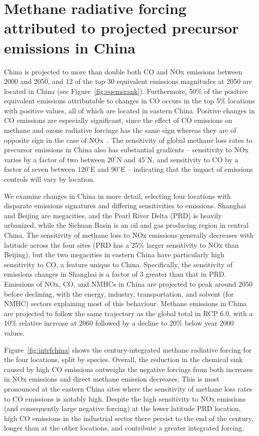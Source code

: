 \section{Methane radiative forcing attributed to projected precursor emissions in China}
\label{sec:china}
China is projected to more than double both CO and NOx emissions between 2000 and 2050, and 12 of the top 30 equivalent emissions magnitudes at 2050 are located in China (see Figure~\ref{fig:eqemsrank}). Furthermore, 50\% of the positive equivalent emissions attributable to changes in CO occurs in the top 5\% locations with positive values, all of which are located in eastern China. Positive changes in CO emissions are especially significant, since the effect of CO emissions on methane and ozone radiative forcings has the same sign whereas they are of opposite sign in the case of NOx~\citep{ref:myhre2013}. The sensitivity of global methane loss rates to precursor emissions in China also has substantial gradients -- sensitivity to NOx varies by a factor of two between $20^{\circ}$N and $45^{\circ}$N, and sensitivity to CO by a factor of seven between $120^{\circ}$E and $90^{\circ}$E -- indicating that the impact of emissions controls will vary by location. 

We examine changes in China in more detail, selecting four locations with disparate emissions signatures and differing sensitivities to emissions. Shanghai and Beijing are megacities, and the Pearl River Delta (PRD) is heavily urbanized, while the Sichuan Basin is an oil and gas producing region in central China. The sensitivity of methane loss to NOx emissions generally decreases with latitude across the four sites (PRD has a 25\% larger sensitivity to NOx than Beijing), but the two megacities in eastern China have particularly high sensitivity to CO, a feature unique to China. Specifically, the sensitivity of  emissions changes in Shanghai is a factor of 3 greater than that in PRD. Emissions of NOx, CO, and NMHCs in China are projected to peak around 2050 before declining, with the energy, industry, transportation, and solvent (for NMHC) sectors explaining most of this behaviour. Methane emissions in China are projected to follow the same trajectory as the global total in RCP 6.0, with a 10\% relative increase at 2060 followed by a decline to 20\% below year 2000 values.

Figure~\ref{fig:intrfchina} shows the century-integrated methane radiative forcing for the four locations, split by species. Overall, the reduction in the chemical sink caused by high CO emissions outweighs the negative forcings from both increases in NOx emissions and direct methane emission decreases. This is most pronounced at the eastern China sites where the sensitivity of methane loss rates to CO emissions is notably high. Despite the high sensitivity to NOx emissions (and consequently large negative forcing) at the lower latitude PRD location, high CO emissions in the industrial sector there persist to the end of the century, longer than at the other locations, and contribute a greater integrated forcing.
